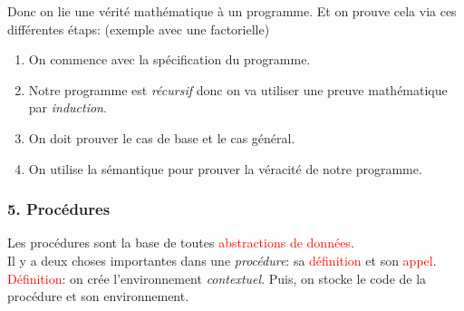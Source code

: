 \documentclass{report}
\begin{document}
Donc on lie une vérité mathématique à un programme. Et on prouve cela via ces différentes étaps: (exemple avec une factorielle)

\begin{enumerate}
\item On commence avec la spécification du programme.
\item Notre programme est \textit{récursif} donc on va utiliser une preuve mathématique par \textit{induction}.
\item On doit prouver le cas de base et le cas général.
\item On utilise la sémantique pour prouver la véracité de notre programme.
\end{enumerate}

\subsubsection{5. Procédures}
Les procédures sont la base de toutes \textcolor{red}{abstractions de données}.\\
Il y a deux choses importantes dans une \textit{procédure}: sa \textcolor{red}{définition} et son \textcolor{red}{appel}.\\

\textcolor{red}{Définition}: on crée l'environnement \textit{contextuel}. Puis, on stocke le code de la procédure et son environnement.\\
\end{document}
